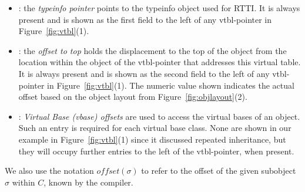 \begin{itemize}
\setlength{\itemsep}{0pt}
\setlength{\parskip}{0pt}
\item {}: the \emph{typeinfo pointer} points to the typeinfo 
      object used for RTTI. It is always present and is shown as the first field 
      to the left of any vtbl-pointer in Figure~\ref{fig:vtbl}(1).
\item {}: the \emph{offset to top} holds the displacement to 
      the top of the object from the location within the object of the 
      vtbl-pointer that addresses this virtual table. It is always present and 
      is shown as the second field to the left of any vtbl-pointer in 
      Figure~\ref{fig:vtbl}(1). The numeric value shown indicates the actual 
      offset based on the object layout from Figure~\ref{fig:objlayout}(2).
\item {}: \emph{Virtual Base (vbase) offsets} are used to access 
      the virtual bases of an object. Such an entry is required for each virtual 
      base class. None are shown in our example in Figure~\ref{fig:vtbl}(1) 
      since it discussed repeated inheritance, but they will occupy further 
      entries to the left of the vtbl-pointer, when present.
\end{itemize}

\noindent
We also use the notation $\mathit{offset}(\sigma)$ to refer to the offset of the 
given subobject $\sigma$ within $C$, known by the compiler.

